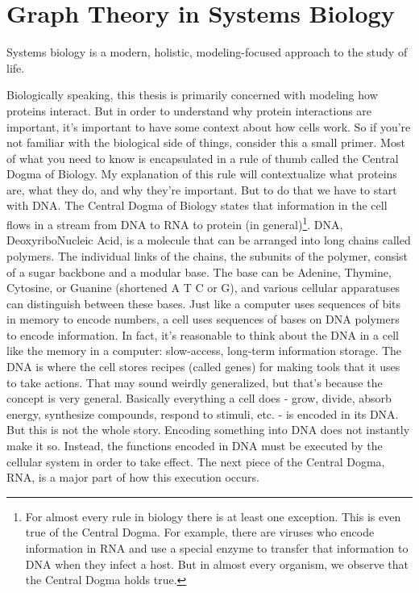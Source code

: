 \documentclass[12pt,twoside]{reedthesis}
\begin{document}
\section{Graph Theory in Systems Biology}
Systems biology is a modern, holistic, modeling-focused approach to the study of life. \par

Biologically speaking, this thesis is primarily concerned with modeling how proteins interact. But in order to understand why protein interactions are important, it's important to have some context about how cells work. So if you're not familiar with the biological side of things, consider this a small primer. Most of what you need to know is encapsulated in a rule of thumb called the Central Dogma of Biology. My explanation of this rule will contextualize what proteins are, what they do, and why they're important. But to do that we have to start with DNA. The Central Dogma of Biology states that information in the cell flows in a stream from DNA to RNA to protein (in general)\footnote{For almost every rule in biology there is at least one exception. This is even true of the Central Dogma. For example, there are viruses who encode information in RNA and use a special enzyme to transfer that information to DNA when they infect a host. But in almost every organism, we observe that the Central Dogma holds true.}. DNA, DeoxyriboNucleic Acid, is a molecule that can be arranged into long chains called polymers. The individual links of the chains, the subunits of the polymer, consist of a sugar backbone and a modular base. The base can be Adenine, Thymine, Cytosine, or Guanine (shortened A T C or G), and various cellular apparatuses can distinguish between these bases. Just like a computer uses sequences of bits in memory to encode numbers, a cell uses sequences of bases on DNA polymers to encode information. In fact, it's reasonable to think about the DNA in a cell like the memory in a computer: slow-access, long-term information storage. The DNA is where the cell stores recipes (called genes) for making tools that it uses to take actions. That may sound weirdly generalized, but that's because the concept is very general. Basically everything a cell does - grow, divide, absorb energy, synthesize compounds, respond to stimuli, etc. - is encoded in its DNA. But this is not the whole story. Encoding something into DNA does not instantly make it so. Instead, the functions encoded in DNA must be executed by the cellular system in order to take effect. The next piece of the Central Dogma, RNA, is a major part of how this execution occurs. \par
	
\end{document}
